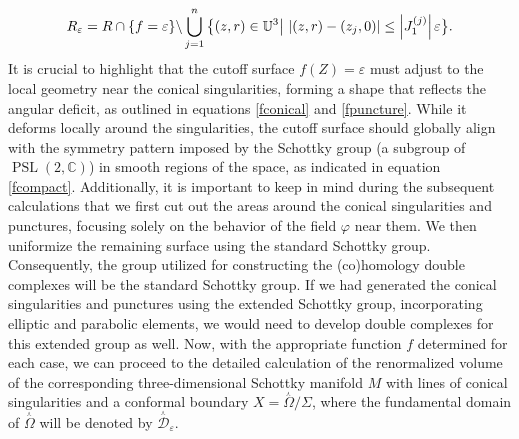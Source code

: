 \documentclass[a4paper,11pt]{article}
\newcommand{\PSLC}{\operatorname{PSL}(2,\mathbb{C})}
\newcommand{\singrigon}{\overset{{}_{\curlywedge}}{\Omega}}
\newcommand{\singfund}{\overset{{}_{\curlywedge}}{\mathcal{D}}}
\begin{document}
\begin{equation}
R_{\varepsilon} = R\cap\{f=\varepsilon\}\backslash \bigcup_{j=1}^{n}\big{\{}(z,r)\in\mathbb{U}^3\big| ~|(z,r)-(z_j,0)| \leq \Big|J_{1}^{(j)}\Big|\hspace{.5mm}\varepsilon\big{\}}.\label{Repsilon}
\end{equation}
It is crucial to highlight that the cutoff surface $f(Z) = \varepsilon$ must adjust to the local geometry near the conical singularities, forming a shape that reflects the angular deficit, as outlined in equations \eqref{fconical} and \eqref{fpuncture}. While it deforms locally around the singularities,  the cutoff surface should globally align with the symmetry pattern imposed by the Schottky group (a subgroup of $\PSLC$) in smooth regions of the space, as indicated in equation \eqref{fcompact}. Additionally, it is important to keep in mind during the subsequent calculations that we first cut out the areas around the conical singularities and punctures, focusing solely on the behavior of the field $\varphi$ near them. We then uniformize the remaining surface using the standard Schottky group. Consequently, the group utilized for constructing the (co)homology double complexes will be the standard Schottky group.  If we had generated the conical singularities and punctures using the extended Schottky group, incorporating elliptic and parabolic elements, we would need to develop double complexes for this extended group as well. Now, with the appropriate function $f$ determined for each case, we can proceed to the detailed calculation of the renormalized volume of the corresponding three-dimensional Schottky manifold $M$ with lines of conical singularities and a conformal boundary $X= \singrigon\slash\Sigma$, where the fundamental domain of $\singrigon$ will be denoted by $\singfund_{\varepsilon}$.
\end{document}
